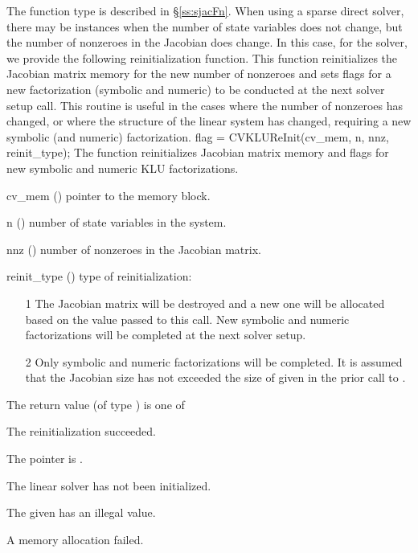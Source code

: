 {
  The function type  is described in \S\ref{ss:sjacFn}.
}
When using a sparse direct solver, there 
may be instances when the number of state variables does not 
change, but the number of nonzeroes in the Jacobian does change.  
In this case, for the {\cvklu} solver, we provide the following reinitialization
function.  This function reinitializes the Jacobian matrix
memory for the new number of nonzeroes and sets flags for a new factorization 
(symbolic and numeric) to be conducted at the next solver setup
call.  This routine is useful in the cases where the number of nonzeroes 
has changed, or where the structure of the linear system has changed,
requiring a new symbolic (and numeric) factorization.
{
  flag = CVKLUReInit(cv\_mem, n, nnz, reinit\_type);
}
{
  The function  reinitializes Jacobian matrix memory and flags for
  new symbolic and numeric KLU factorizations.
}
{
  \begin{args}[cv\_mem]
  \item[cv\_mem] ()
    pointer to the {\cvode} memory block.
  \item[n] ()
    number of state variables in the system.
  \item[nnz] ()
    number of nonzeroes in the Jacobian matrix.
  \item[reinit\_type] ()
    type of reinitialization:
    \begin{itemize}
    \item[1]  The Jacobian matrix will be destroyed and a new one will 
      be allocated based on the  value passed to this call. New symbolic and
      numeric factorizations will be completed at the next
      solver setup.
    \item[2]  Only symbolic and numeric factorizations will be completed.  
      It is assumed that the Jacobian size has not exceeded the size of 
       given in the prior call to {\cvklu}.
    \end{itemize}
  \end{args}
}
{
  The return value  (of type ) is one of
  \begin{args}
  \item[\Id{CVSLS\_SUCCESS}] 
    The reinitialization succeeded.
  \item[\Id{CVSLS\_MEM\_NULL}]
    The  pointer is .
  \item[\Id{CVSLS\_LMEM\_NULL}]
    The {\cvklu} linear solver has not been initialized.
  \item[\Id{CVSLS\_ILL\_INPUT}]
    The given  has an illegal value.
  \item[\Id{CVSLS\_MEM\_FAIL}]
    A memory allocation failed.
  \end{args}
}
